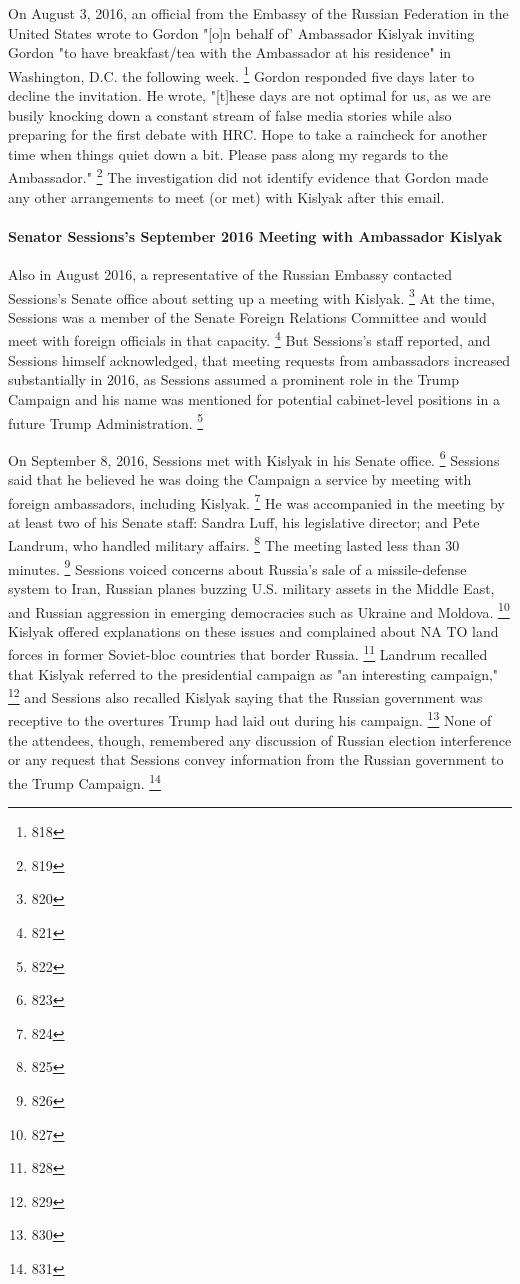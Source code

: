 On August 3, 2016, an official from the Embassy of the Russian Federation in the United States wrote to Gordon "[o]n behalf of' Ambassador Kislyak inviting Gordon "to have breakfast/tea with the Ambassador at his residence" in Washington, D.C. the following week.%
\footnote{818}
Gordon responded five days later to decline the invitation.
He wrote, "[t]hese days are not optimal for us, as we are busily knocking down a constant stream of false media stories while also preparing for the first debate with HRC.
Hope to take a raincheck for another time when things quiet down a bit.
Please pass along my regards to the Ambassador."%
\footnote{819}
The investigation did not identify evidence that Gordon made any other arrangements to meet (or met) with Kislyak after this email.

\paragraph{Senator Sessions's September 2016 Meeting with Ambassador Kislyak}

Also in August 2016, a representative of the Russian Embassy contacted Sessions's Senate office about setting up a meeting with Kislyak.%
\footnote{820}
At the time, Sessions was a member of the Senate Foreign Relations Committee and would meet with foreign officials in that capacity.%
\footnote{821}
But Sessions's staff reported, and Sessions himself acknowledged, that meeting requests from ambassadors increased substantially in 2016, as Sessions assumed a prominent role in the Trump Campaign and his name was mentioned for potential cabinet-level positions in a future Trump Administration.%
\footnote{822}

On September 8, 2016, Sessions met with Kislyak in his Senate office.%
\footnote{823}
Sessions said that he believed he was doing the Campaign a service by meeting with foreign ambassadors, including Kislyak.%
\footnote{824}
He was accompanied in the meeting by at least two of his Senate staff: Sandra Luff, his legislative director; and Pete Landrum, who handled military affairs.%
\footnote{825}
The meeting lasted less than 30 minutes.%
\footnote{826}
Sessions voiced concerns about Russia's sale of a missile-defense system to Iran, Russian planes buzzing U.S. military assets in the Middle East, and Russian aggression in emerging democracies such as Ukraine and Moldova.%
\footnote{827}
Kislyak offered explanations on these issues and complained about NA TO land forces in former Soviet-bloc countries that border Russia.%
\footnote{828}
Landrum recalled that Kislyak referred to the presidential campaign as "an interesting campaign,"%
\footnote{829}
and Sessions also recalled Kislyak saying that the Russian government was receptive to the overtures Trump had laid out during his campaign.%
\footnote{830}
None of the attendees, though, remembered any discussion of Russian election interference or any request that Sessions convey information from the Russian government to the Trump Campaign.%
\footnote{831}


